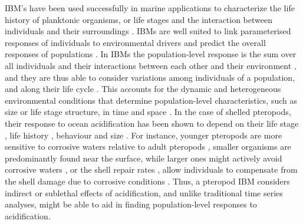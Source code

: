 IBM's have been used successfully in marine applications to characterize the life history of planktonic organisms, or life stages and the interaction between individuals and their surroundings \citep[e.g. ]{Werner1997Fish,Parada2003Anchovy,Miller1998CalanusIBM}. IBMs are well suited to link parameterised responses of individuals to environmental drivers and predict the overall responses of populations \citep{Stillman2014BenefitsIBM}. 
In IBMs the population-level response is the sum over all individuals and their interactions between each other and their environment \citep{DeAngelis2014IBM}, and they are thus able to consider variations among individuals of a population, and along their life cycle \citep{DeAngelis2014IBM}. This accounts for the dynamic and heterogeneous environmental conditions that determine population-level characteristics, such as size or life stage structure, in time and space \citep{Stillman2014BenefitsIBM}. 
In the case of shelled pteropods, their response to ocean acidification has been shown to depend on their life stage \citep{Bednarsek2016CumulativeEffects}, life history \citep{Bednarsek2017ExposureHistory}, behaviour \citep{Bednarsek2015VerticalDistribution} and size \citep{Bednarsek2014CalcificationDissolution}. For instance, younger pteropods are more sensitive to corrosive waters relative to adult pteropods \citep{Bednarsek2016CumulativeEffects}, smaller organisms are predominantly found near the surface, while larger ones might actively avoid corrosive waters \citep{Bednarsek2015VerticalDistribution}, or the shell repair rates \citep{Bednarsek2014CalcificationDissolution}, allow individuals to compensate from the shell damage due to corrosive conditions \citep{Comeau2010RepairRates}. Thus, a pteropod IBM considers indirect or sublethal effects of acidification, and unlike traditional time series analyses, might be able to aid in finding population-level responses to acidification.



